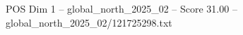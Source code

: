 \begin{textsample}{POS Dim 1 – global\_north\_2025\_02 – Score 31.00 – global\_north\_2025\_02/121725298.txt}
\end{textsample}
